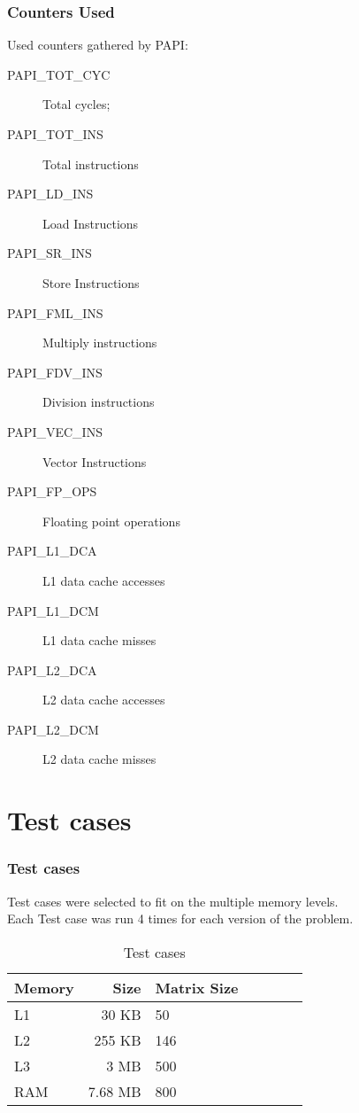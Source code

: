 \documentclass{beamer}
\begin{document}
\begin{frame}
	\frametitle{Counters Used}

	Used counters gathered by PAPI:
	\begin{description}
		\item[PAPI\_TOT\_CYC] Total cycles;
		\item[PAPI\_TOT\_INS] Total instructions
		\item[PAPI\_LD\_INS] Load Instructions
		\item[PAPI\_SR\_INS] Store Instructions
		\item[PAPI\_FML\_INS] Multiply instructions
		\item[PAPI\_FDV\_INS] Division instructions
		\item[PAPI\_VEC\_INS] Vector Instructions
		\item[PAPI\_FP\_OPS] Floating point operations
		\item[PAPI\_L1\_DCA] L1 data cache accesses
		\item[PAPI\_L1\_DCM] L1 data cache misses
		\item[PAPI\_L2\_DCA] L2 data cache accesses
		\item[PAPI\_L2\_DCM] L2 data cache misses
	\end{description}
\end{frame}

\section{Test cases}
\begin{frame}
	\frametitle{Test cases}

	Test cases were selected to fit on the multiple memory levels.\\
	Each Test case was run 4 times for each version of the problem.

	\begin{center}
		\begin{table}[!htp]
	\begin{tabular}{lrlrlrl}
		\hline
		\textbf{Memory} & \textbf{Size} & \textbf{Matrix Size} \\
		\hline
		L1 & 30 KB & 50 \\
		L2 & 255 KB & 146 \\
		L3 & 3 MB & 500 \\
		RAM & 7.68 MB & 800 \\
		\hline
	\end{tabular}
	\caption{Test cases}
	\label{tab:testcases}
\end{table}
	\end{center}
\end{frame}
\end{document}
